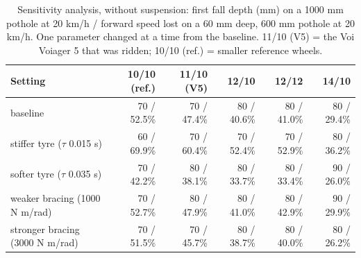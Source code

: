 \begin{table}[htbp]
\centering\small
\caption{Sensitivity analysis, without suspension: first fall depth (mm) on a 1000 mm pothole at 20 km/h / forward speed lost on a 60 mm deep, 600 mm pothole at 20 km/h. One parameter changed at a time from the baseline. 11/10 (V5) = the Voi Voiager 5 that was ridden; 10/10 (ref.) = smaller reference wheels.}\label{tab:Esensnofork}
\begin{tabular}{@{}p{40mm}rrrrr@{}}
\toprule
Setting & 10/10 (ref.) & 11/10 (V5) & 12/10 & 12/12 & 14/10 \\
\midrule
baseline & 70 / 52.5\% & 70 / 47.4\% & 80 / 40.6\% & 80 / 41.0\% & 80 / 29.4\% \\
stiffer tyre ($\tau$ 0.015 s) & 60 / 69.9\% & 70 / 60.4\% & 70 / 52.4\% & 70 / 52.9\% & 80 / 36.2\% \\
softer tyre ($\tau$ 0.035 s) & 70 / 42.2\% & 80 / 38.1\% & 80 / 33.7\% & 80 / 33.4\% & 90 / 26.0\% \\
weaker bracing (1000 N m/rad) & 70 / 52.7\% & 80 / 47.9\% & 80 / 41.0\% & 80 / 42.9\% & 90 / 29.9\% \\
stronger bracing (3000 N m/rad) & 70 / 51.5\% & 70 / 45.7\% & 80 / 38.7\% & 80 / 40.0\% & 80 / 26.2\% \\
\bottomrule
\end{tabular}
\end{table}
